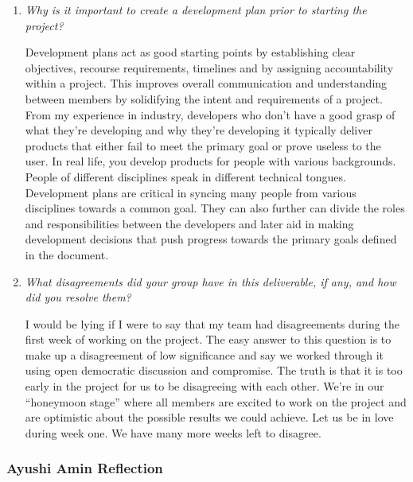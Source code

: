 \documentclass{article}
\begin{document}
\begin{enumerate}
  \item \textit{Why is it important to create a development plan
    prior to starting the project?}

    Development plans act as good starting points by establishing
    clear objectives, recourse requirements, timelines and by
    assigning accountability within a project. This improves overall
    communication and understanding between members by solidifying
    the intent and requirements of a project. From my experience in
    industry, developers who don’t have a good grasp of what they’re
    developing and why they’re developing it typically deliver
    products that either fail to meet the primary goal or prove useless to
    the user. In real life, you develop products for people with
    various backgrounds. People of different disciplines speak in different
    technical tongues. Development plans are critical in syncing many
    people from various disciplines towards a common goal. They can also
    further can divide the roles and responsibilities between the
    developers and later aid in making development decisions that push
    progress towards the primary goals defined in the document.

  \item \textit{What disagreements did your group have in this
    deliverable, if any, and how did you resolve them?}

    I would be lying if I were to say that my team had disagreements
    during the first week of working on the project. The easy answer to
    this question is to make up a disagreement of low significance
    and say we worked through it using open democratic discussion and
    compromise. The truth is that it is too early in the project for
    us to be disagreeing with each other. We’re in our “honeymoon stage”
    where all members are excited to work on the project and are
    optimistic about the possible results we could achieve. Let us be in love
    during week one. We have many more weeks left to disagree.

\end{enumerate}

\subsubsection*{Ayushi Amin Reflection}
\end{document}

